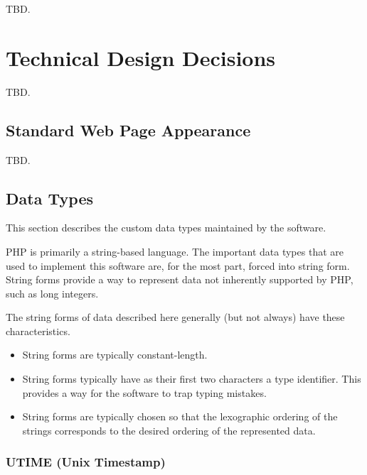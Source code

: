\documentclass[letterpaper,10pt,titlepage]{article}
\begin{document}
TBD.


\section{Technical Design Decisions}
\label{stdd0}

TBD.


\subsection{Standard Web Page Appearance}
\label{stdd0:swpa0}

TBD.


\subsection{Data Types}
\label{stdd0:sdty0}

%
This section describes the custom data types maintained by the software.

PHP is primarily a string-based language.  The important data types that
are used to implement this software are, for the most part, forced into
string form.  String forms provide a way to represent data not inherently
supported by PHP, such as long integers.

The string forms of data described here generally (but not always)
have these characteristics.

\begin{itemize}
\item String forms are typically constant-length.
\item String forms typically have as their first two characters a type identifier.
      This provides a way for the software to trap typing mistakes.
\item String forms are typically chosen so that the
      lexographic ordering of the strings corresponds to the desired ordering of the
      represented data.
\end{itemize}



\subsubsection{UTIME (Unix Timestamp)}
\label{stdd0:sdty0:sutm0}
\end{document}
